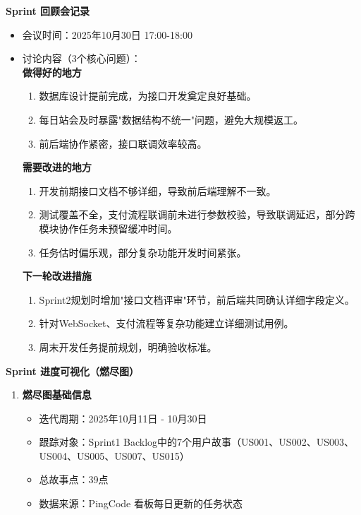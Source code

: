 \begin{levellist}
    \item \textbf{Sprint 回顾会记录}
    \begin{itemize}
        \item 会议时间：2025年10月30日 17:00-18:00
        \item 讨论内容（3个核心问题）： \\
              \textbf{做得好的地方}
              \begin{enumerate}
                  \item 数据库设计提前完成，为接口开发奠定良好基础。
                  \item 每日站会及时暴露"数据结构不统一"问题，避免大规模返工。
                  \item 前后端协作紧密，接口联调效率较高。
              \end{enumerate}
              \textbf{需要改进的地方}
              \begin{enumerate}
                  \item 开发前期接口文档不够详细，导致前后端理解不一致。
                  \item 测试覆盖不全，支付流程联调前未进行参数校验，导致联调延迟，部分跨模块协作任务未预留缓冲时间。
                  \item 任务估时偏乐观，部分复杂功能开发时间紧张。
              \end{enumerate}
              \textbf{下一轮改进措施}
              \begin{enumerate}
                  \item Sprint2规划时增加"接口文档评审"环节，前后端共同确认详细字段定义。
                  \item 针对WebSocket、支付流程等复杂功能建立详细测试用例。
                  \item 周末开发任务提前规划，明确验收标准。
              \end{enumerate}
    \end{itemize}

    \item \textbf{Sprint 进度可视化（燃尽图）}
    \begin{enumerate}
        \item \textbf{燃尽图基础信息}
              \begin{itemize}
                  \item 迭代周期：2025年10月11日 - 10月30日
                  \item 跟踪对象：Sprint1 Backlog中的7个用户故事（US001、US002、US003、US004、US005、US007、US015）
                  \item 总故事点：39点
                  \item 数据来源：PingCode 看板每日更新的任务状态
              \end{itemize}



\end{enumerate}
\end{levellist}
